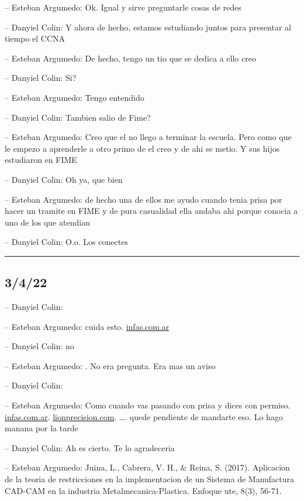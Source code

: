 -- Esteban Argumedo: Ok. Igual y sirve preguntarle cosas de redes

-- Danyiel Colin: Y ahora de hecho, estamos estudiando juntos para
presentar al tiempo el CCNA

-- Esteban Argumedo: De hecho, tengo un tio que se dedica a ello creo

-- Danyiel Colin: Si?

-- Esteban Argumedo: Tengo entendido

-- Danyiel Colin: Tambien salio de Fime?

-- Esteban Argumedo: Creo que el no llego a terminar la escuela. Pero
como que le empezo a aprenderle a otro primo de el creo y de ahi se
metio. Y sus hijos estudiaron en FIME

-- Danyiel Colin: Oh ya, que bien

-- Esteban Argumedo: de hecho una de ellos me ayudo cuando tenia prisa
por hacer un tramite en FIME y de pura casualidad ella andaba ahi porque
conocia a uno de los que atendian

-- Danyiel Colin: O.o. Los conectes

\begin{center}\rule{0.5\linewidth}{0.5pt}\end{center}

\hypertarget{section-23}{%
\subsection{3/4/22}\label{section-23}}

-- Danyiel Colin:

-- Esteban Argumedo: cuida esto.
\href{https://www.infas.com.ar/repetibilidad-y-reproducibilidad/}{infas.com.ar}

-- Danyiel Colin: no

-- Esteban Argumedo: . No era pregunta. Era mas un aviso

-- Danyiel Colin:

-- Esteban Argumedo: Como cuando vas pasando con prisa y dices con
permiso.
\href{https://www.infas.com.ar/repetibilidad-y-reproducibilidad/}{infas.com.ar}.
\href{https://www.lionprecision.com/es/definition-resolution/\#:~:text=La\%20resoluci\%C3\%B3n\%20se\%20define\%20como,ruido\%20el\%C3\%A9ctrico\%20en\%20la\%20salida.}{lionprecision.com}.
\ldots. quede pendiente de mandarte eso. Lo hago manana por la tarde

-- Danyiel Colin: Ah es cierto. Te lo agradeceria

-- Esteban Argumedo: Juina, L., Cabrera, V. H., \& Reina, S. (2017).
Aplicacion de la teoria de restricciones en la implementacion de un
Sistema de Manufactura CAD-CAM en la industria Metalmecanica-Plastica.
Enfoque ute, 8(3), 56-71.

